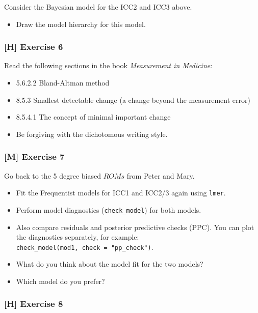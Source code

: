 \documentclass[
]{article}
\providecommand{\tightlist}{%
  \setlength{\itemsep}{0pt}\setlength{\parskip}{0pt}}
\begin{document}
Consider the Bayesian model for the ICC2 and ICC3 above.

\begin{itemize}
\tightlist
\item
  Draw the model hierarchy for this model.
\end{itemize}

\subsubsection{{[}H{]} Exercise 6}\label{exercise6}

Read the following sections in the book \emph{Measurement in Medicine}:

\begin{itemize}
\tightlist
\item
  5.6.2.2 Bland-Altman method
\item
  8.5.3 Smallest detectable change (a change beyond the measurement error)
\item
  8.5.4.1 The concept of minimal important change
\item
  Be forgiving with the dichotomous writing style.
\end{itemize}

\subsubsection{{[}M{]} Exercise 7}\label{exercise7}

Go back to the 5 degree biased \(ROMs\) from Peter and Mary.

\begin{itemize}
\tightlist
\item
  Fit the Frequentist models for ICC1 and ICC2/3 again using \texttt{lmer}.
\item
  Perform model diagnostics (\texttt{check\_model}) for both models.
\item
  Also compare residuals and posterior predictive checks (PPC). You can
  plot the diagnostics separately, for example: \texttt{check\_model(mod1,\ check\ =\ "pp\_check")}.
\item
  What do you think about the model fit for the two models?
\item
  Which model do you prefer?
\end{itemize}

\subsubsection{{[}H{]} Exercise 8}\label{exercise8}
\end{document}
